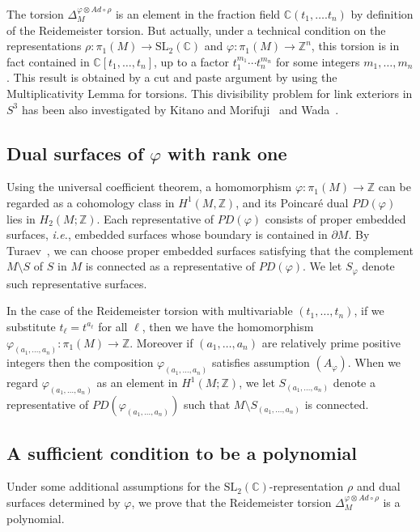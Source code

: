 \documentclass[a4paper]{amsart}
\theoremstyle{plain}
\theoremstyle{definition}
\theoremstyle{remark}
\newcommand{\ie}{\emph{i.e.}}
\newcommand{\ZZ}{{\mathbb Z}}
\newcommand{\CC}{{\mathbb C}}
\newcommand{\SL}{{\mathrm{SL}_2(\CC)}}
\newcommand{\PolyTors}[2]{\Delta_{#1}^{#2}}
\newcommand{\otAd}[2]{#1 \otimes Ad \circ #2}
\newcommand{\bord}{\partial}
\begin{document}
The torsion $\PolyTors{M}{\otAd{\varphi}{\rho}}$ is an element in the
fraction field $\CC(t_1, \ldots. t_n)$ by definition of the
Reidemeister torsion.  But actually, under a technical condition on
the representations $\rho \colon \pi_1(M) \to \SL$ and $\varphi \colon
\pi_1(M) \to \ZZ^n$, this torsion is in fact contained in $\CC[t_1,
\ldots, t_n]$, up to a factor $t_1^{m_1} \cdots t_n^{m_n}$ for some
integers $m_1, \ldots, m_n$.  This result is obtained by a cut and
paste argument by using the Multiplicativity Lemma for torsions.
This divisibility problem for link exteriors in $S^3$ has been also investigated by
Kitano and Morifuji~\cite{KitanoMorifuji05:divisibility} and Wada~\cite{Wada94}.

\subsection{Dual surfaces of $\varphi$ with rank one}\label{subsec:dual}

Using the universal coefficient theorem, a homomorphism $\varphi
\colon \pi_1(M) \to \ZZ$ can be regarded as a cohomology class in
$H^1(M, \ZZ)$, and its Poincar\'e dual $PD(\varphi)$ lies in
$H_2(M;\ZZ)$. Each representative of $PD(\varphi)$ consists of proper embedded
surfaces, \ie, embedded surfaces whose boundary is contained in $\bord
M$.  By Turaev~\cite{turaev:homol_estim}, we can choose proper
embedded surfaces satisfying that the complement $M \setminus S$ of $S$ in $M$ is connected
as a representative of $PD(\varphi)$.  We let $S_\varphi$ denote such 
representative surfaces.

In the case of the Reidemeister torsion with multivariable $(t_1,
\ldots, t_n)$, if we substitute $t_\ell = t^{a_\ell}$ for all $\ell$, then we have the homomorphism $\varphi_{(a_1, \ldots, a_n)}
\colon \pi_1(M) \to \ZZ$.  Moreover if $(a_1, \ldots,
a_n)$ are relatively prime positive integers then the composition $\varphi_{(a_1, \ldots, a_n)}$ satisfies assumption
$(A_\varphi)$.  When we regard $\varphi_{(a_1, \ldots, a_n)}$ as an
element in $H^1(M;\ZZ)$, we let $S_{(a_1, \ldots, a_n)}$ denote a
representative of $PD(\varphi_{(a_1, \ldots, a_n)})$ such that $M
\setminus S_{(a_1, \ldots, a_n)}$ is connected.

\subsection{A sufficient condition to be a polynomial}

Under some additional assumptions for the $\SL$-representation $\rho$
and dual surfaces determined by $\varphi$, we prove that the Reidemeister torsion
$\PolyTors{M}{\otAd{\varphi}{\rho}}$ is a polynomial.
\end{document}

